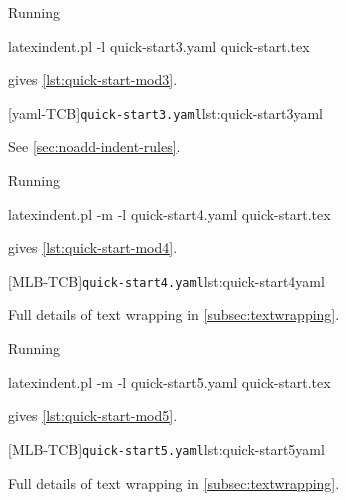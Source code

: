  \begin{example}
 Running

 \begin{commandshell}
latexindent.pl -l quick-start3.yaml quick-start.tex
\end{commandshell}

 gives \cref{lst:quick-start-mod3}.

 \begin{cmhtcbraster}
  [yaml-TCB]{\texttt{quick-start3.yaml}}{lst:quick-start3yaml}
 \end{cmhtcbraster}
 See \cref{sec:noadd-indent-rules}.
 \end{example}

 \begin{example}
 Running

 \begin{commandshell}
latexindent.pl -m -l quick-start4.yaml quick-start.tex
\end{commandshell}

 gives \cref{lst:quick-start-mod4}.

 \begin{cmhtcbraster}
  [MLB-TCB]{\texttt{quick-start4.yaml}}{lst:quick-start4yaml}
 \end{cmhtcbraster}
 Full details of text wrapping in \cref{subsec:textwrapping}.
 \end{example}

 \begin{example}
 Running

 \begin{commandshell}
latexindent.pl -m -l quick-start5.yaml quick-start.tex
\end{commandshell}

 gives \cref{lst:quick-start-mod5}.

 \begin{cmhtcbraster}
  [MLB-TCB]{\texttt{quick-start5.yaml}}{lst:quick-start5yaml}
 \end{cmhtcbraster}
 Full details of text wrapping in \cref{subsec:textwrapping}.
 \end{example}

